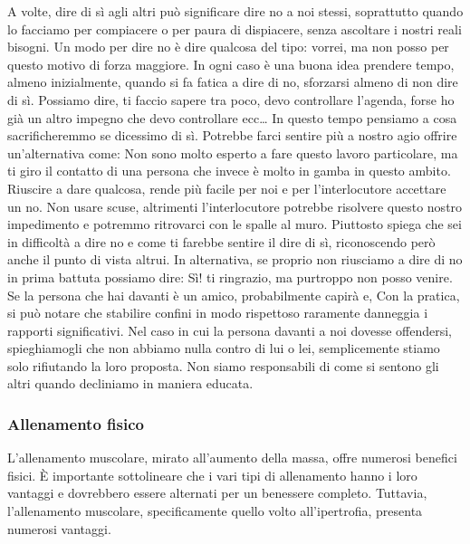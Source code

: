\documentclass[12pt]{book} %
\begin{document}
A volte, dire di sì agli altri può significare dire no a noi stessi, soprattutto quando lo facciamo per compiacere o per paura di dispiacere, senza ascoltare i nostri reali bisogni.
Un modo per dire no è dire qualcosa del tipo: vorrei, ma non posso per questo motivo di forza maggiore. In
ogni caso è una buona idea prendere tempo, almeno inizialmente, quando si fa fatica a dire di no, sforzarsi almeno di
non dire di sì. Possiamo dire, ti faccio sapere tra poco, devo controllare l'agenda, forse ho già
un altro impegno che devo controllare ecc… In questo tempo pensiamo a cosa sacrificheremmo se dicessimo di sì. Potrebbe
farci sentire più a nostro agio offrire un'alternativa come: Non sono molto esperto a fare questo
lavoro particolare, ma ti giro il contatto di una persona che invece è molto in gamba in questo ambito. Riuscire a dare
qualcosa, rende più facile per noi e per l'interlocutore accettare un no. Non usare scuse,
altrimenti l'interlocutore potrebbe risolvere questo nostro impedimento e potremmo ritrovarci con le
spalle al muro. Piuttosto spiega che sei in difficoltà a dire no e come ti farebbe sentire il dire di sì, riconoscendo
però anche il punto di vista altrui. In alternativa, se proprio non riusciamo a dire di no in prima battuta possiamo
dire: Sì! ti ringrazio, ma purtroppo non posso venire. Se la persona che hai davanti è un amico, probabilmente capirà e, Con la pratica, si può notare che stabilire confini in modo rispettoso raramente danneggia i rapporti significativi. Nel caso in cui la persona davanti a noi
dovesse offendersi, spieghiamogli che non abbiamo nulla contro di lui o lei, semplicemente stiamo solo rifiutando la
loro proposta. Non siamo responsabili di come si sentono gli altri quando decliniamo in maniera educata.

\subsubsection{Allenamento fisico}
L'allenamento muscolare, mirato all'aumento della massa, offre numerosi benefici fisici. È importante sottolineare che i vari tipi di allenamento hanno i loro vantaggi e dovrebbero essere alternati per un benessere completo. Tuttavia, l'allenamento muscolare, specificamente quello volto all'ipertrofia, presenta numerosi vantaggi.
\end{document}
